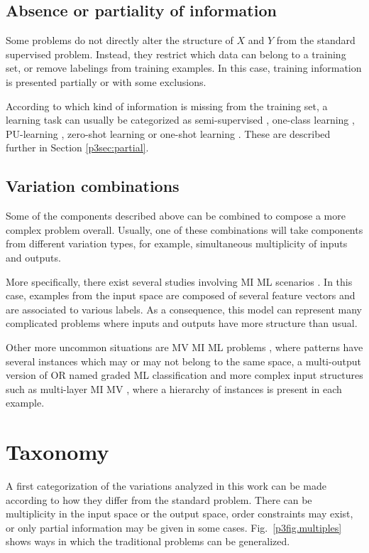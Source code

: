\subsection{Absence or partiality of information}

Some problems do not directly alter the structure of $X$ and $Y$ from the standard supervised problem. Instead, they restrict which data can belong to a training set, or remove labelings from training examples. In this case, training information is presented partially or with some exclusions.

According to which kind of information is missing from the training set, a learning task  can usually be categorized as semi-supervised \cite{semi-sup}, one-class learning \cite{oneclass}, PU-learning \cite{pu-learn}, zero-shot learning \cite{zeroshot} or one-shot learning \cite{oneshot}. These are described further in Section \ref{p3sec:partial}.

\subsection{Variation combinations}

Some of the components described above can be combined to compose a more complex problem overall. Usually, one of these combinations will take components from different variation types, for example, simultaneous multiplicity of inputs and outputs. 

More specifically, there exist several studies involving MI ML scenarios \cite{miml,miml2}. In this case, examples from the input space are composed of several feature vectors and are associated to various labels. As a consequence, this model can represent many complicated problems where inputs and outputs have more structure than usual.

Other more uncommon situations are MV MI ML problems \cite{mvmiml}, where patterns have several instances which may or may not belong to the same space, a multi-output version of OR named graded ML classification \cite{graded-ml} and more complex input structures such as multi-layer MI MV \cite{mlmimv}, where a hierarchy of instances is present in each example. 

\section{Taxonomy}
\label{p3sec:taxonomy}

A first categorization of the variations analyzed in this work can be made according to how they differ from the standard problem. There can be multiplicity in the input space or the output space, order constraints may exist, or only partial information may be given in some cases. Fig.~\ref{p3fig.multiples} shows ways in which the traditional problems can be generalized. 

